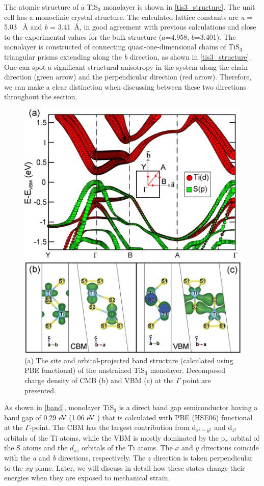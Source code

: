 The atomic structure of a TiS$_3$ monolayer is shown in \autoref{tis3_structure}. The unit cell has a monoclinic crystal structure. The calculated lattice constants  are \textit{a} =  5.03 ~{\AA} and \textit{b} = 3.41~{\AA}, in good agreement with previous calculations \cite{Kang2015,Jin2015} and close to the experimental values for the bulk structure ($a$=4.958, $b$=3.401)\cite{Furuseth1975}. The monolayer is constructed of connecting quasi-one-dimensional chains of TiS$_3$ triangular prisms extending along the \textit{b} direction, as shown in \autoref{tis3_structure}. One can spot a significant structural anisotropy in the system along the chain direction (green arrow) and  the perpendicular direction (red arrow). Therefore, we can make a clear distinction when discussing between these two directions throughout the section.

\begin{figure}[htb]
\centering
\includegraphics[width=0.8\linewidth]{Mob_projected_bands.eps}
\caption{(a) The site and orbital-projected band structure (calculated using PBE functional) of the unstrained TiS$_3$ monolayer.  Decomposed charge density of CMB (b) and  VBM (c) at the $\Gamma$ point are presented. \label{band} }
\end{figure}

As shown in \autoref{band}, monolayer TiS$_3$ is a direct band gap semiconductor having a band gap of 0.29 eV (1.06 eV \cite{Dai2015}) that is calculated with PBE (HSE06) functional at the $\Gamma$-point.  The CBM has the largest contribution from d$_{x^2-y^2}$ and d$_{z^2}$ orbitals of the Ti atoms, while the VBM is mostly dominated by the p$_x$ orbital of the S atoms and  the $d_{xz}$ orbitals of the Ti atoms. The $x$ and $y$ directions coincide with the \textit{a} and \textit{b} directions, respectively. The $z$ direction is taken perpendicular to the $xy$ plane. Later, we will discuss in detail how these states change their energies when they are exposed to mechanical strain.

